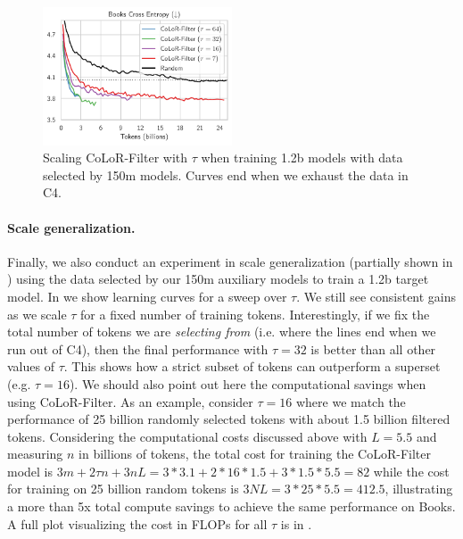 \documentclass{article}
\begin{document}
\begin{figure}
    \centering
    \vspace{-1.1cm}
    \includegraphics[width=0.5\textwidth]{images/1b_all_books.pdf}
    \vspace{-0.6cm}
    \caption{Scaling CoLoR-Filter with $ \tau$ when training 1.2b models with data selected by 150m models. Curves end when we exhaust the data in C4.}
    \label{fig:books_1b_tau}
\end{figure}

\paragraph{Scale generalization.} Finally, we also conduct an experiment in scale generalization (partially shown in ) using the data selected by our 150m auxiliary models to train a 1.2b target model. 
In  we show learning curves for a sweep over $ \tau$.
We still see consistent gains as we scale $ \tau$ for a fixed number of training tokens. 
Interestingly, if we fix the total number of tokens we are \emph{selecting from} (i.e. where the lines end when we run out of C4), then the final performance with $\tau = 32$ is better than all other values of $ \tau$.
This shows how a strict subset of tokens can outperform a superset (e.g. $ \tau=16$).
We should also point out here the computational savings when using CoLoR-Filter.
As an example, consider $ \tau=16$ where we match the performance of 25 billion randomly selected tokens with about 1.5 billion filtered tokens. Considering the computational costs discussed above with $ L = 5.5$ and measuring $ n $ in billions of tokens, the total cost for training the CoLoR-Filter model is $ 3 m + 2\tau n + 3nL = 3 * 3.1 + 2 * 16 * 1.5 + 3 * 1.5 * 5.5 = 82 $ while the cost for training on 25 billion random tokens is $ 3NL = 3 * 25 * 5.5 = 412.5$, illustrating a more than 5x total compute savings to achieve the same performance on Books. A full plot visualizing the cost in FLOPs for all $ \tau$ is in .
\end{document}
